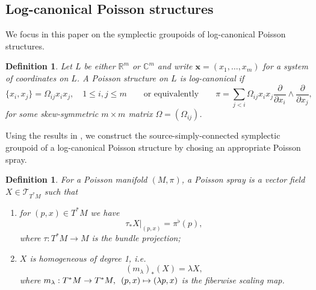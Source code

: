 \documentclass{amsart}
\newtheorem{definition}[theorem]{Definition}
\numberwithin{equation}{section}
\newcommand{\bfx}{{\boldsymbol{x}}}
\newcommand{\cT}{\mathcal{T}}
\newcommand{\CC}{\mathbb{C}}
\newcommand{\RR}{\mathbb{R}}
\begin{document}
\subsection{Log-canonical Poisson structures}
We focus in this paper on the symplectic groupoids of log-canonical Poisson structures.
\begin{definition} 
  \label{def: logPoisson}
  Let $L$ be either $\RR^m$ or $\CC^m$ and write $\bfx = (x_1, \ldots, x_m)$ for a system of coordinates on $L$.
  A Poisson structure on $L$ is \emph{log-canonical} if
  $$
    \{x_i, x_j\} = \Omega_{ij} x_ix_j, \quad 1 \leq i,j \leq m \qquad \text{or equivalently} \qquad
    \pi = \sum_{j < i} \Omega_{ij} x_ix_j\frac{\partial}{\partial x_i} \wedge \frac{\partial}{\partial x_j},
  $$
  for some skew-symmetric $m\times m$ matrix $\Omega = (\Omega_{ij})$.
\end{definition}

Using the results in \cite{CM11, CMS17}, we construct the source-simply-connected symplectic groupoid of a log-canonical Poisson structure by chosing an appropriate Poisson spray. 
\begin{definition} 
  \cite{CM11}
  For a Poisson manifold $(M, \pi)$, a \emph{Poisson spray} is a vector field $X \in \cT_{T^*M}$ such that
  \begin{enumerate}
    \item for $(p,x) \in T^*M$ we have
      \[\tau_* X|_{(p,x)} = \pi^\flat(p),\]
      where $\tau: T^*M \to M$ is the bundle projection;
    \item $X$ is homogeneous of degree 1, i.e.
      \[(m_\lambda)_*(X) = \lambda X,\]
      where $m_\lambda: T^*M \to T^*M, \enskip (p,x) \mapsto (\lambda p,x)$ is the fiberwise scaling map.
  \end{enumerate}
\end{definition}
\end{document}
